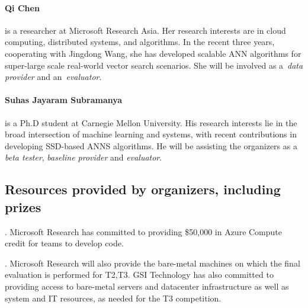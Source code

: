 \paragraph{Qi Chen} is a researcher at Microsoft Research Asia. Her research interests are in cloud computing, distributed systems, and algorithms. In the recent three years, cooperating with Jingdong Wang, she has developed scalable ANN algorithms for super-large scale real-world vector search scenarios. She will be involved as a~\emph{data provider} and an~\emph{evaluator}. 

\paragraph{Suhas Jayaram Subramanya} is a Ph.D student at Carnegie Mellon University. His research interests lie in the broad intersection of machine learning and systems, with recent contributions in developing SSD-based ANNS algorithms. He will be assisting the organizers as a \emph{beta tester}, \emph{baseline provider} and \emph{evaluator}.

\iffalse


\fi


\subsection{Resources provided by organizers, including prizes}


. Microsoft Research has committed to providing
\$50,000 in Azure Compute credit for teams to develop code.  

.  Microsoft Research will also
provide the bare-metal machines on which the final evaluation is
performed for T2,T3. GSI Technology has also committed to providing
access to bare-metal servers and datacenter infrastructure as well as
system and IT resources, as needed for the T3 competition.

